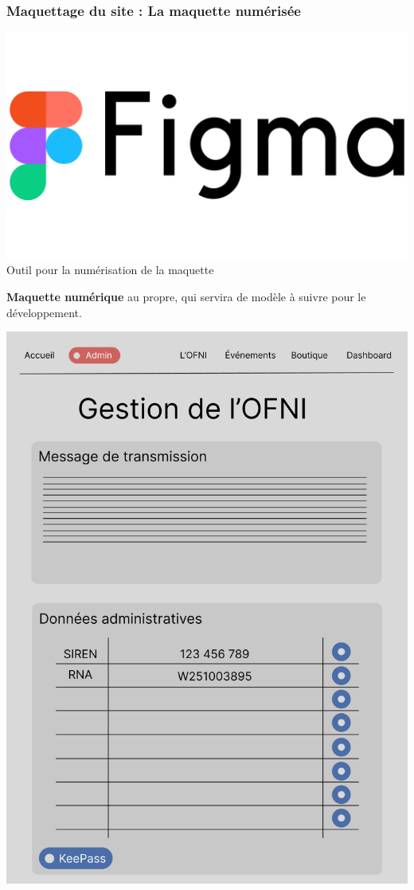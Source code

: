 \begin{frame}
    \frametitle{Maquettage du site : La maquette numérisée}

    \begin{minipage}{0.48\textwidth}
        \centering
        \includegraphics[width=\linewidth]{pictures/figma_logo.png}
	Outil pour la numérisation de la maquette
	\bigskip

	\textbf{Maquette numérique} au propre, qui servira de modèle à suivre pour le développement.
    \end{minipage}
    \hfill
    \begin{minipage}{0.48\textwidth}
        \centering
        \includegraphics[width=\linewidth]{pictures/figma.png}
    \end{minipage}

\end{frame}

